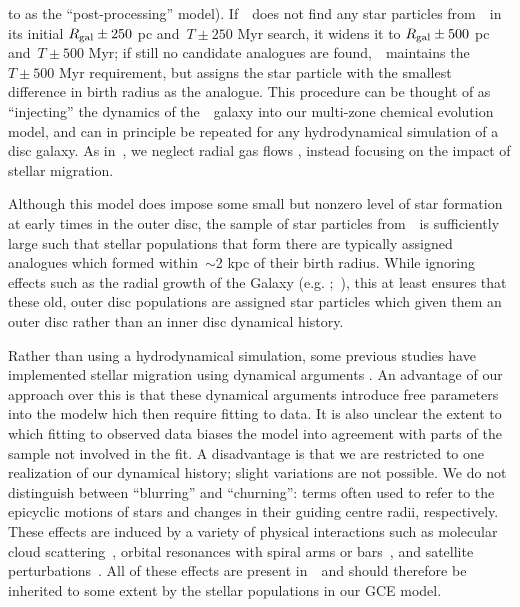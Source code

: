 \documentclass[ms.tex]{subfiles}
\begin{document}
to as the ``post-processing'' model).
If~\vice~does not find any star particles from~\hsim~in its initial
$R_\text{gal} \pm 250$ pc and~$T \pm 250$ Myr search, it widens it to
$R_\text{gal} \pm 500$ pc and~$T \pm 500$ Myr; if still no candidate analogues are
found,~\vice~maintains the~$T \pm 500$ Myr requirement, but assigns the star
particle with the smallest difference in birth radius as the analogue.
This procedure can be thought of as ``injecting'' the dynamics of
the~\hsim~galaxy into our multi-zone chemical evolution model, and can in
principle be repeated for any hydrodynamical simulation of a disc galaxy.
As in~\citet{Johnson2021}, we neglect radial gas flows
\citep[e.g.][]{Lacey1985, Bilitewski2012, Vincenzo2020}, instead focusing on
the impact of stellar migration.
\par
Although this model does impose some small but nonzero level of star formation
at early times in the outer disc, the sample of star particles from~\hsim~is
sufficiently large such that stellar populations that form there are typically
assigned analogues which formed within~$\sim$2 kpc of their birth radius.
While ignoring effects such as the radial growth of the Galaxy (e.g.
\citealp*{Bird2012};~\citealp{Bird2013}), this at least ensures that these old,
outer disc populations are assigned star particles which given them an outer
disc rather than an inner disc dynamical history.
\par
Rather than using a hydrodynamical simulation, some previous studies have
implemented stellar migration using dynamical arguments
\citep[e.g.][]{Schoenrich2009, Sharma2021}.
An advantage of our approach over this is that these dynamical arguments
introduce free parameters into the modelw hich then require fitting to data.
It is also unclear the extent to which fitting to observed data biases the
model into agreement with parts of the sample not involved in the fit.
A disadvantage is that we are restricted to one realization of our dynamical
history; slight variations are not possible.
We do not distinguish between ``blurring'' and ``churning'': terms often used
to refer to the epicyclic motions of stars and changes in their guiding centre
radii, respectively.
These effects are induced by a variety of physical interactions such as
molecular cloud scattering~\citep{Mihalas1981, Jenkins1990, Jenkins1992},
orbital resonances with spiral arms or bars~\citep{Sellwood2002, Minchev2011},
and satellite perturbations~\citep{Bird2012}.
All of these effects are present in~\hsim~and should therefore be inherited to
some extent by the stellar populations in our GCE model.
\end{document}
